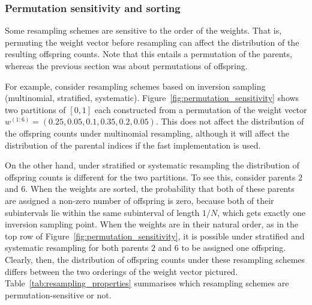 \subsubsection{Permutation sensitivity and sorting}
Some resampling schemes are sensitive to the order of the weights.
That is, permuting the weight vector before resampling can affect the distribution of the resulting offspring counts.
Note that this entails a permutation of the parents, whereas the previous section was about permutations of offspring.

For example, consider resampling schemes based on inversion sampling (multinomial, stratified, systematic). Figure~\ref{fig:permutation_sensitivity} shows two partitions of $[0,1]$ each constructed from a permutation of the weight vector $w^{(1:6)} = (0.25,0.05,0.1,0.35,0.2,0.05)$.
This does not affect the distribution of the offspring counts under multinomial resampling, although it will affect the distribution of the parental indices if the fast implementation is used.

On the other hand, under stratified or systematic resampling the distribution of offspring counts is different for the two partitions. To see this, consider parents $2$ and $6$. When the weights are sorted, the probability that both of these parents are assigned a non-zero number of offspring is zero, because both of their subintervals lie within the same subinterval of length $1/N$, which gets exactly one inversion sampling point.
When the weights are in their natural order, as in the top row of Figure~\ref{fig:permutation_sensitivity}, it is possible under stratified and systematic resampling for both parents $2$ and $6$ to be assigned one offspring.
Clearly, then, the distribution of offspring counts under these resampling schemes differs between the two orderings of the weight vector pictured. 
Table~\ref{tab:resampling_properties} summarises which resampling schemes are permutation-sensitive  or not.
%

